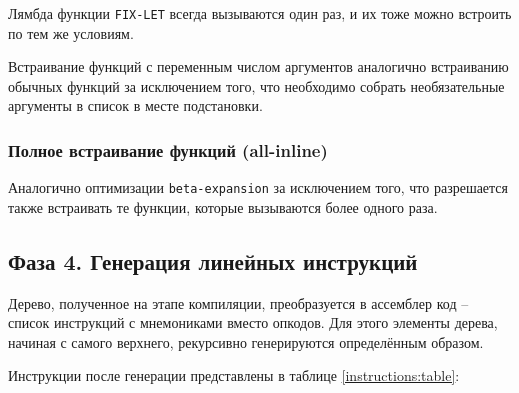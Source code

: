 Лямбда функции \texttt{FIX-LET} всегда вызываются один раз, и их тоже можно встроить по тем же условиям.

Встраивание функций с переменным числом аргументов аналогично встраиванию обычных функций за исключением того, что необходимо собрать необязательные аргументы в список в месте подстановки.


\subsubsection{Полное встраивание функций (all-inline)}

Аналогично оптимизации \texttt{beta-expansion} за исключением того, что разрешается также встраивать те функции, которые вызываются более одного раза.


\subsection{Фаза 4. Генерация линейных инструкций}

Дерево, полученное на этапе компиляции, преобразуется в ассемблер код -- список инструкций с мнемониками вместо опкодов. Для этого элементы дерева, начиная с самого верхнего, рекурсивно генерируются определённым образом.

Инструкции после генерации представлены в таблице \ref{instructions:table}:

